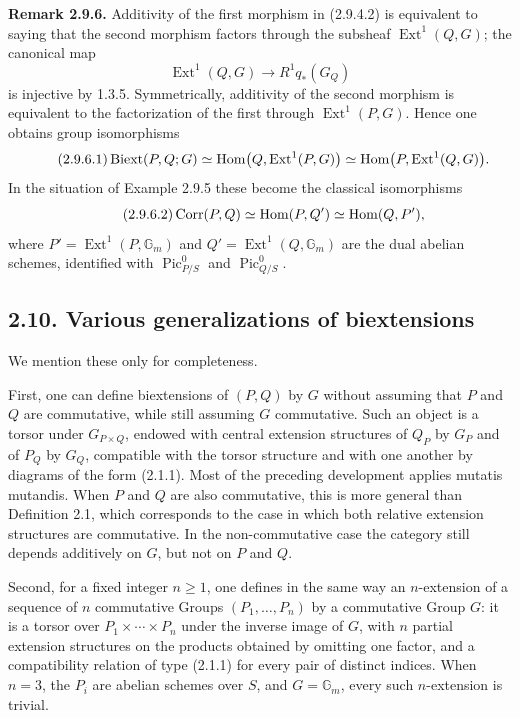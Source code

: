 \documentclass[11pt]{article}
\providecommand{\Pic}{\operatorname{Pic}}
\providecommand{\Ext}{\operatorname{Ext}}
\begin{document}
\textbf{Remark 2.9.6.}  Additivity of the first morphism in (2.9.4.2) is equivalent to saying that the second morphism factors through the subsheaf \(\Ext^1(Q,G)\); the canonical map
\begin{equation}\tag{2.9.6.0}
  \Ext^1(Q,G)\longrightarrow R^1q_*(G_Q)
\end{equation}
is injective by 1.3.5.  Symmetrically, additivity of the second morphism is equivalent to the factorization of the first through \(\Ext^1(P,G)\).  Hence one obtains group isomorphisms
\begin{equation}\tag{2.9.6.1}
  \Biext(P,Q;G)
  \simeq \operatorname{Hom}\bigl(Q,\Ext^1(P,G)\bigr)
  \simeq \operatorname{Hom}\bigl(P,\Ext^1(Q,G)\bigr).
\end{equation}
In the situation of Example 2.9.5 these become the classical isomorphisms
\begin{equation}\tag{2.9.6.2}
  \operatorname{Corr}(P,Q)\simeq \operatorname{Hom}(P,Q')\simeq\operatorname{Hom}(Q,P'),
\end{equation}
where \(P'=\Ext^1(P,\mathbb G_m)\) and \(Q'=\Ext^1(Q,\mathbb G_m)\) are the dual abelian schemes, identified with \(\Pic^0_{P/S}\) and \(\Pic^0_{Q/S}\).

\subsection*{2.10. Various generalizations of biextensions}
We mention these only for completeness.

First, one can define biextensions of \((P,Q)\) by \(G\) without assuming that \(P\) and \(Q\) are commutative, while still assuming \(G\) commutative.  Such an object is a torsor under \(G_{P\times Q}\), endowed with central extension structures of \(Q_P\) by \(G_P\) and of \(P_Q\) by \(G_Q\), compatible with the torsor structure and with one another by diagrams of the form (2.1.1).  Most of the preceding development applies mutatis mutandis.  When \(P\) and \(Q\) are also commutative, this is more general than Definition 2.1, which corresponds to the case in which both relative extension structures are commutative.  In the non-commutative case the category still depends additively on \(G\), but not on \(P\) and \(Q\).

Second, for a fixed integer \(n\geq1\), one defines in the same way an \(n\)-extension of a sequence of \(n\) commutative Groups \((P_1,\ldots,P_n)\) by a commutative Group \(G\): it is a torsor over \(P_1\times\cdots\times P_n\) under the inverse image of \(G\), with \(n\) partial extension structures on the products obtained by omitting one factor, and a compatibility relation of type (2.1.1) for every pair of distinct indices.  When \(n=3\), the \(P_i\) are abelian schemes over \(S\), and \(G=\mathbb G_m\), every such \(n\)-extension is trivial.
\end{document}

